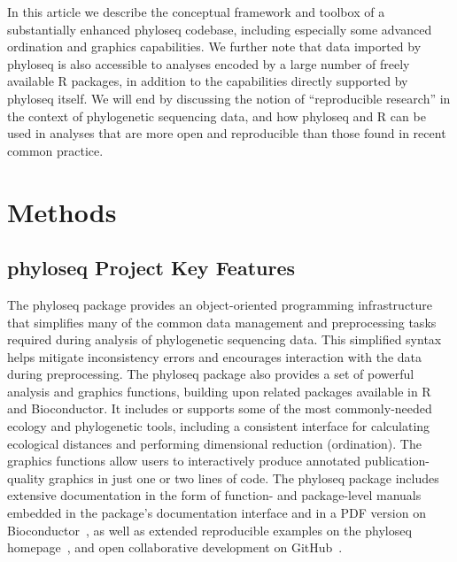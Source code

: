 \documentclass[10pt]{article}\usepackage{graphicx, color}
\newcommand{\R}{{\textsf{R}}}
\begin{document}
In this article we describe the conceptual framework and toolbox
of a substantially enhanced phyloseq codebase,
including especially some advanced ordination and graphics capabilities.
We further note that data imported by phyloseq
is also accessible to analyses encoded by
a large number of freely available \R{} packages,
in addition to the capabilities directly supported by phyloseq itself.
We will end by discussing
the notion of ``reproducible research''
in the context of phylogenetic sequencing data,
and how phyloseq and \R{} can be used
in analyses that are more open and reproducible
than those found in recent common practice.

\section*{Methods}

\subsection*{phyloseq Project Key Features}
The phyloseq package
provides an object-oriented programming infrastructure
that simplifies many of the common data management and preprocessing tasks
required during analysis of phylogenetic sequencing data. 
This simplified syntax helps
mitigate inconsistency errors 
and encourages interaction 
with the data during preprocessing.
The phyloseq package also provides
a set of powerful analysis and graphics functions, 
building upon related packages available in \R{} and Bioconductor.
It includes or supports
some of the most commonly-needed ecology and phylogenetic tools,
including a consistent interface
for calculating ecological distances
and performing dimensional reduction (ordination).
The graphics functions allow users to interactively produce
annotated publication-quality graphics
in just one or two lines of code.
The phyloseq package includes extensive documentation
in the form of 
function- and package-level manuals embedded
in the package's documentation interface
and in a PDF version on Bioconductor~\cite{phyloseq:man:link},
as well as 
extended reproducible examples on the phyloseq homepage~\cite{phyloseq:github},
and open collaborative development on GitHub~\cite{phyloseq:github}.
\end{document}
